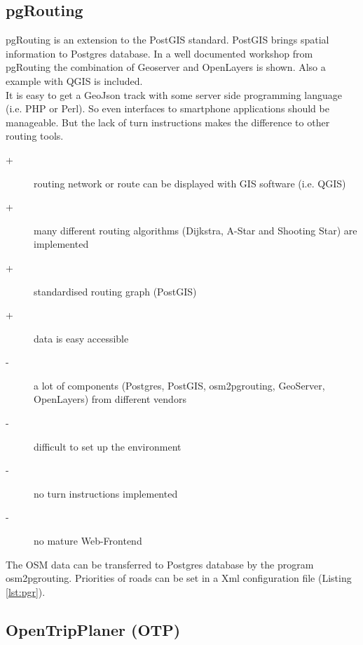 \documentclass{sig-alternate}
\begin{document}
\subsection{pgRouting}
pgRouting\cite{pgrouting} is an extension to the PostGIS standard. PostGIS brings spatial information to Postgres database. In a well documented workshop from pgRouting the combination of Geoserver and OpenLayers is shown. Also a example with QGIS is included. \\
It is easy to get a GeoJson track with  some server side programming language (i.e. PHP or Perl). So even interfaces to smartphone applications should be manageable. But the lack of turn instructions makes the difference to other routing tools.  

\begin{description}
  \item[+] routing network or route can be displayed with GIS software (i.e. QGIS)
  \item[+] many different routing algorithms (Dijkstra, A-Star and Shooting Star)  are implemented
  \item[+] standardised routing graph (PostGIS)
  \item[+] data is easy accessible
  \item[-] a lot of components (Postgres, PostGIS, osm2pgrouting, GeoServer, OpenLayers) from different vendors   
  \item[-] difficult to set up the environment 
  \item[-] no turn instructions implemented
  \item[-] no mature Web-Frontend  
\end{description} 

The OSM data can be transferred to Postgres database by the program osm2pgrouting. Priorities of roads can be set in a Xml configuration file (Listing \ref{lst:pgr}).



\subsection{OpenTripPlaner (OTP)}
\label{subsec:otp}
 
\end{document}
